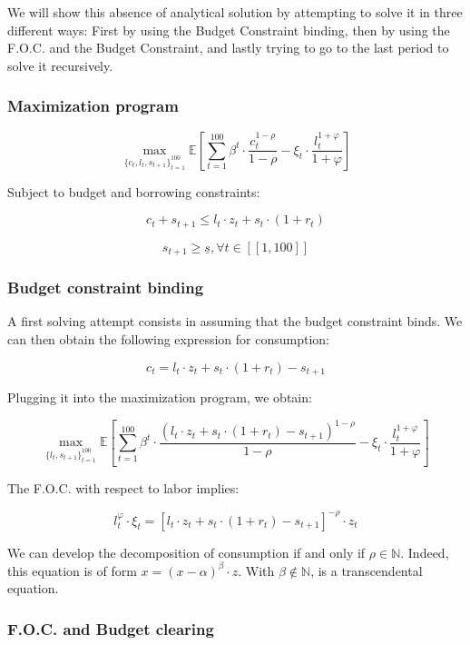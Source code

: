 \documentclass{article}
\begin{document}
We will show this absence of analytical solution by attempting to solve it in three different 
ways: First by using the Budget Constraint binding, then by using the F.O.C. and the Budget Constraint,
and lastly trying to go to the last period to solve it recursively. 

\subsubsection{Maximization program}

$$ \max_{\{c_{t},l_{t},s_{t+1}\}_{t=1}^{100}}
{\mathbb{E}\left[\sum_{t=1}^{100} \beta^{t}\cdot \frac{c_{t}^{1-\rho}}{1-\rho}-\xi_{t}\cdot \frac{l_{t}^{1+\varphi}}{1+\varphi}\right]}$$

Subject to budget and borrowing constraints:

$$c_{t} + s_{t+1} \leq l_{t}\cdot z_{t} + s_{t}\cdot(1+r_{t})$$

$$s_{t+1}\geq \underline{s}, \forall t \in [\![1,100]\!]$$

\subsubsection{Budget constraint binding}

A first solving attempt consists in assuming that the budget constraint binds.
We can then obtain the following expression for consumption: 

$$c_{t} = l_{t}\cdot z_{t} + s_{t}\cdot(1+r_{t}) - s_{t+1}$$

Plugging it into the maximization program, we obtain:

$$ \max_{\{l_{t},s_{t+1}\}_{t=1}^{100}}
{\mathbb{E}\left[\sum_{t=1}^{100} \beta^{t}\cdot \frac{\left(l_{t}\cdot z_{t} + s_{t}\cdot(1+r_{t}) - s_{t+1}\right)^{1-\rho}}{1-\rho}-\xi_{t}\cdot \frac{l_{t}^{1+\varphi}}{1+\varphi}\right]}$$

The F.O.C. with respect to labor implies: 

\begin{equation}
    l_{t}^{\varphi}\cdot \xi_{t} = \left[l_{t}\cdot z_{t} + s_{t}\cdot(1+r_{t})- s_{t+1}\right]^{-\rho}\cdot z_{t}
\end{equation}

We can develop the decomposition of consumption if and only if $\rho \in \mathbb{N}$.
Indeed, this equation is of form $x = (x-\alpha)^{\beta} \cdot z$.
With $\beta\notin \mathbb{N}$, is a transcendental equation.

\subsubsection{F.O.C. and Budget clearing}
\end{document}
